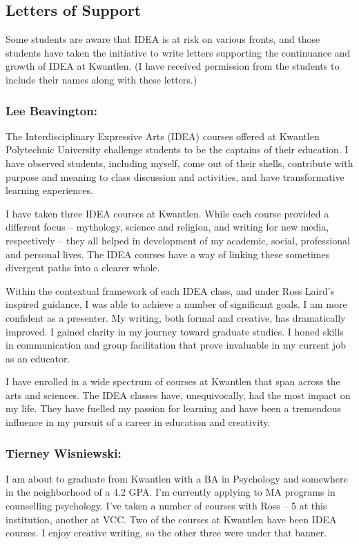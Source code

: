 \documentclass[letterpaper,10pt,headsepline]{scrreprt}
\begin{document}
\subsection{Letters of Support}

Some students are aware that IDEA is at risk on various fronts, and those students have taken the initiative to write letters supporting the continuance and growth of IDEA at Kwantlen. (I have received permission from the students to include their names along with these letters.)

\subsubsection{Lee Beavington:}

 The Interdisciplinary Expressive Arts (IDEA) courses offered at Kwantlen Polytechnic University challenge students to be the captains of their education. I have observed students, including myself, come out of their shells, contribute with purpose and meaning to class discussion and activities, and have transformative learning experiences.

I have taken three IDEA courses at Kwantlen. While each course provided a different focus -- mythology, science and religion, and writing for new media, respectively -- they all helped in development of my academic, social, professional and personal lives. The IDEA courses have a way of linking these sometimes divergent paths into a clearer whole.

Within the contextual framework of each IDEA class, and under Ross Laird's inspired guidance, I was able to achieve a number of significant goals. I am more confident as a presenter. My writing, both formal and creative, has dramatically improved. I gained clarity in my journey toward graduate studies. I honed skills in communication and group facilitation that prove invaluable in my current job as an educator.

I have enrolled in a wide spectrum of courses at Kwantlen that span across the arts and sciences. The IDEA classes have, unequivocally, had the most impact on my life. They have fuelled my passion for learning and have been a tremendous influence in my pursuit of a career in education and creativity.

\subsubsection{Tierney Wisniewski:}

 I am about to graduate from Kwantlen with a BA in Psychology and somewhere in the neighborhood of a 4.2 GPA. I'm currently applying to MA programs in counselling psychology. I've taken a number of courses with Ross -- 5 at this institution, another at VCC. Two of the courses at Kwantlen have been IDEA courses. I enjoy creative writing, so the other three were under that banner.
\end{document}
